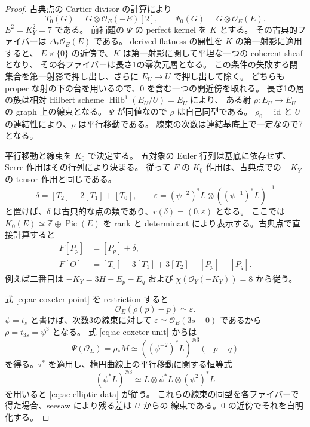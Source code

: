 \begin{proof}
古典点の Cartier divisor の計算により
\[
 T_0(G)=G\otimes\mathcal O_E(-E)[2],\qquad
 \Psi_0(G)=G\otimes\mathcal O_E(E).
\]
$E^2=K_Y^2=7$ である。
前補題の $\Psi$ の perfect kernel を $K$ とする。
その古典的ファイバーは $\Delta_*\mathcal O_E(E)$ である。
derived flatness の開性を $K$ の第一射影に適用すると、
$E\times\{0\}$ の近傍で、$K$ は第一射影に関して平坦な一つの coherent sheaf となり、
その各ファイバーは長さ1の零次元層となる。
この条件の失敗する閉集合を第一射影で押し出し、さらに $E_U\to U$ で押し出して除く。
どちらも proper な射の下の台を用いるので、$0$ を含む一つの開近傍を取れる。
長さ1の層の族は相対 Hilbert scheme $\operatorname{Hilb}^1(E_U/U)=E_U$ により、
ある射 $\rho\colon E_U\to E_U$ の graph 上の線束となる。
$\Psi$ が同値なので $\rho$ は自己同型である。
$\rho_0=\mathrm{id}$ と $U$ の連結性により、$\rho$ は平行移動である。
線束の次数は連結基底上で一定なので7となる。

平行移動と線束を $K_0$ で決定する。
五対象の Euler 行列は基底に依存せず、Serre 作用はその行列により決まる。
従って $F$ の $K_0$ 作用は、古典点での $-K_Y$ の tensor 作用と同じである。
\[
 \delta=[T_2]-2[T_1]+[T_0],\qquad
 \varepsilon=(\psi^{-2})^*L\otimes((\psi^{-1})^*L)^{-1}
\]
と置けば、$\delta$ は古典的な点の類であり、$r(\delta)=(0,\varepsilon)$ となる。
ここでは $K_0(E)\simeq\mathbb Z\oplus\operatorname{Pic}(E)$ を rank と determinant
により表示する。古典点で直接計算すると
\begin{align}
 F[P_p]&=[P_p]+\delta,\label{eq:ac-coxeter-point}\\
 F[O]&=[T_0]-3[T_1]+3[T_2]-[P_p]-[P_q].\label{eq:ac-coxeter-unit}
\end{align}
例えば二番目は $-K_Y=3H-E_p-E_q$ および
$\chi(\mathcal O_Y(-K_Y))=8$ から従う。

式 \eqref{eq:ac-coxeter-point} を restriction すると
\[
        \mathcal O_E(\rho(p)-p)\simeq\varepsilon.
\]
$\psi=t_s$ と書けば、次数3の線束に対して
$\varepsilon\simeq\mathcal O_E(3s-0)$ であるから $\rho=t_{3s}=\psi^3$ となる。
式 \eqref{eq:ac-coxeter-unit} からは
\[
 \Psi(\mathcal O_E)=\rho_*M
 \simeq ((\psi^{-2})^*L)^{\otimes3}(-p-q)
\]
を得る。$\tau^*$ を適用し、楕円曲線上の平行移動に関する恒等式
\[
             (\psi^*L)^{\otimes3}\simeq
             L\otimes\psi^*L\otimes(\psi^2)^*L
\]
を用いると \eqref{eq:ac-elliptic-data} が従う。
これらの線束の同型を各ファイバーで得た場合、seesaw により残る差は $U$ からの
線束である。$0$ の近傍でそれを自明化する。
\end{proof}

